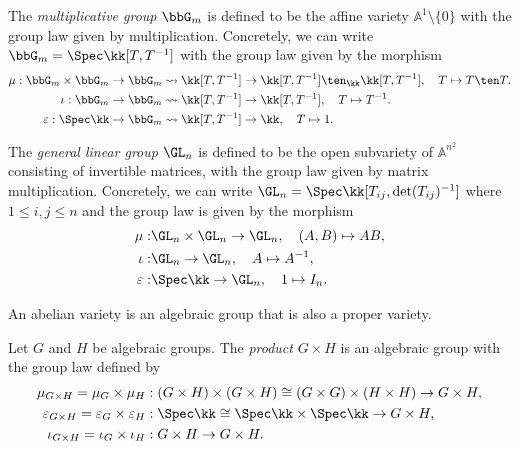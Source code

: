     \begin{example}\label{eg:multiplicative_group}
        The \emph{multiplicative group} $\bbG_m$ is defined to be the affine variety $\mathbb{A}^1 \setminus \{0\}$ with the group law given by multiplication.
        Concretely, we can write $\bbG_m = \Spec \kk[T,T^{-1}]$ with the group law given by the morphism
        \begin{align*}
            \mu: \bbG_m \times \bbG_m \to \bbG_m & \leadsto \kk[T,T^{-1}] \to \kk[T,T^{-1}]\ten_\kk \kk[T,T^{-1}], \quad T \mapsto T\ten T. \\
            \iota: \bbG_m \to \bbG_m & \leadsto \kk[T,T^{-1}] \to \kk[T,T^{-1}], \quad T \mapsto T^{-1}. \\
            \varepsilon: \Spec \kk \to \bbG_m & \leadsto \kk[T,T^{-1}] \to \kk, \quad T \mapsto 1.
        \end{align*}
    \end{example}

    \begin{example}\label{eg:general_linear_group}
        The \emph{general linear group} $\GL_n$ is defined to be the open subvariety of $\mathbb{A}^{n^2}$ consisting of invertible matrices, with the group law given by matrix multiplication.
        Concretely, we can write \(\GL_n = \Spec \kk[T_{ij}, \det(T_{ij})^{-1}]\) where \(1 \leq i,j \leq n\) and the group law is given by the morphism
        \begin{align*}
            \mu: & \GL_n \times \GL_n \to \GL_n, \quad (A,B) \mapsto AB, \\
            \iota: & \GL_n \to \GL_n, \quad A \mapsto A^{-1}, \\
            \varepsilon: & \Spec \kk \to \GL_n, \quad 1 \mapsto I_n.
        \end{align*}
    \end{example}

    \begin{example}\label{eg:abelian_varieties_as_algebraic_groups}
        An abelian variety is an algebraic group that is also a proper variety.
    \end{example}

    \begin{example}\label{eg:product_of_algebraic_groups}
        Let \(G\) and \(H\) be algebraic groups.
        The \emph{product} \(G \times H\) is an algebraic group with the group law defined by
        \begin{align*}
            \mu_{G \times H} = \mu_G \times \mu_H &: (G \times H) \times (G \times H) \cong (G \times G) \times (H \times H) \to G \times H, \\   
            \varepsilon_{G \times H} = \varepsilon_G \times \varepsilon_H &: \Spec \kk \cong \Spec \kk \times \Spec \kk \to G \times H, \\
            \iota_{G \times H} = \iota_G \times \iota_H &: G \times H \to G \times H.
        \end{align*}
    \end{example}

